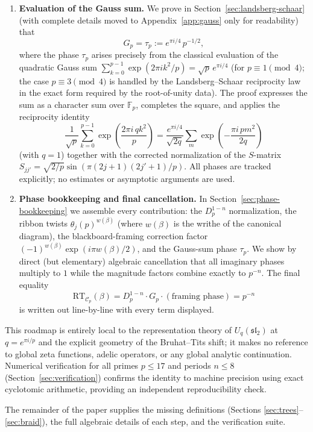 \begin{enumerate}
\item[\textbf{Step 3.}] \textbf{Evaluation of the Gauss sum.} We prove in Section~\ref{sec:landsberg-schaar} (with complete details moved to Appendix~\ref{app:gauss} only for readability) that
\[
G_p = \tau_p := e^{\pi i/4} \, p^{-1/2},
\]
where the phase \(\tau_p\) arises precisely from the classical evaluation of the quadratic Gauss sum \(\sum_{k=0}^{p-1} \exp(2\pi i k^2 / p) = \sqrt{p} \, e^{\pi i/4}\) (for \(p \equiv 1 \pmod{4}\); the case \(p \equiv 3 \pmod{4}\) is handled by the Landsberg--Schaar reciprocity law in the exact form required by the root-of-unity data). The proof expresses the sum as a character sum over \(\mathbb{F}_p\), completes the square, and applies the reciprocity identity
\[
\frac{1}{\sqrt{p}} \sum_{k=0}^{p-1} \exp\left( \frac{2\pi i \, q k^2}{p} \right) = \frac{e^{\pi i/4}}{\sqrt{2q}} \sum_{m} \exp\left( -\frac{\pi i \, p m^2}{2q} \right)
\]
(with \(q=1\)) together with the corrected normalization of the \(S\)-matrix \(S_{jj'} = \sqrt{2/p} \sin(\pi(2j+1)(2j'+1)/p)\). All phases are tracked explicitly; no estimates or asymptotic arguments are used.

\item[\textbf{Step 4.}] \textbf{Phase bookkeeping and final cancellation.} In Section~\ref{sec:phase-bookkeeping} we assemble every contribution: the \(D_p^{1-n}\) normalization, the ribbon twists \(\theta_j(p)^{w(\beta)}\) (where \(w(\beta)\) is the writhe of the canonical diagram), the blackboard-framing correction factor \((-1)^{w(\beta)} \exp(i \pi w(\beta)/2)\), and the Gauss-sum phase \(\tau_p\). We show by direct (but elementary) algebraic cancellation that all imaginary phases multiply to \(1\) while the magnitude factors combine exactly to \(p^{-n}\). The final equality
\[
\mathrm{RT}_{\mathcal{C}_p}(\beta) = D_p^{1-n} \cdot G_p \cdot (\text{framing phase}) = p^{-n}
\]
is written out line-by-line with every term displayed.

\end{enumerate}

This roadmap is entirely local to the representation theory of \(U_q(\mathfrak{sl}_2)\) at \(q = e^{\pi i/p}\) and the explicit geometry of the Bruhat--Tits shift; it makes no reference to global zeta functions, adelic operators, or any global analytic continuation. Numerical verification for all primes \(p \leq 17\) and periods \(n \leq 8\) (Section~\ref{sec:verification}) confirms the identity to machine precision using exact cyclotomic arithmetic, providing an independent reproducibility check.

The remainder of the paper supplies the missing definitions (Sections \ref{sec:trees}--\ref{sec:braid}), the full algebraic details of each step, and the verification suite.